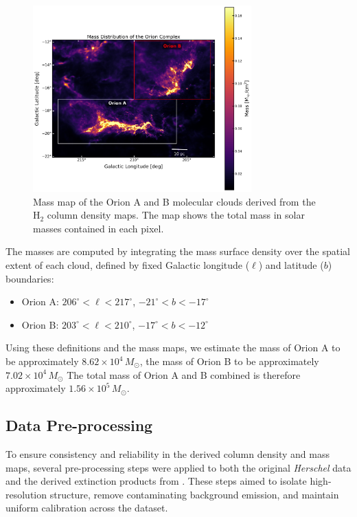\begin{figure}[t]
    \centering
    \includegraphics[width=0.75\textwidth]{figures/mass_distribution.png}
    \caption{Mass map of the Orion A and B molecular clouds derived from the H$_2$ column density maps. The map shows the total mass in solar masses contained in each pixel.}
    \label{fig:mass_map}
\end{figure}

The masses are computed by integrating the mass surface density over the spatial extent of each cloud, defined by fixed Galactic longitude ($\ell$) and latitude ($b$) boundaries:

\begin{itemize}
    \item Orion A: $206^\circ < \ell < 217^\circ$, $-21^\circ < b < -17^\circ$
    \item Orion B: $203^\circ < \ell < 210^\circ$, $-17^\circ < b < -12^\circ$
\end{itemize}

Using these definitions and the mass maps, we estimate the mass of Orion A to be approximately $8.62 \times 10^4 \, M_\odot$, the mass of Orion B to be approximately $7.02 \times 10^4 \, M_\odot$
The total mass of Orion A and B combined is therefore approximately $1.56 \times 10^5 \, M_\odot$.

\subsection{Data Pre-processing}

To ensure consistency and reliability in the derived column density and mass maps, several pre-processing steps were applied to both the original \textit{Herschel} data and the derived extinction products from \cite{lombardi2014herschel}. These steps aimed to isolate high-resolution structure, remove contaminating background emission, and maintain uniform calibration across the dataset.

